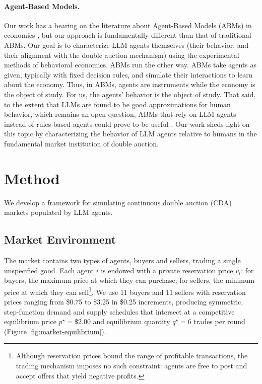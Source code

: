 \documentclass[letterpaper]{article} %
\begin{document}
\paragraph{Agent-Based Models.} Our work has a bearing on the literature about Agent-Based Models (ABMs) in economics \cite{tesfatsion2006handbook}, but our approach is fundamentally different than that of traditional ABMs. Our goal is to characterize LLM agents themselves (their behavior, and their alignment with the double auction mechanism) using the experimental methods of behavioral economics. ABMs run the other way. ABMs take agents as given, typically with fixed decision rules, and simulate their interactions to learn about the economy. Thus, in ABMs, agents are instruments while the economy is the object of study. For us, the agents' behavior is the object of study. That said, to the extent that LLMs are found to be good approximations for human behavior, which remains an open question, ABMs that rely on LLM agents instead of rules-based agents could prove to be useful \citep{gaoLargeLanguageModels2023, liEconAgentLargeLanguage2024a}. Our work sheds light on this topic by characterizing the behavior of LLM agents relative to humans in the fundamental market institution of double auction.

  \section{Method}

  We develop a framework for simulating continuous double auction (CDA) markets
  populated by LLM agents.

\subsection{Market Environment}
The market contains two types of agents, buyers and sellers, trading a single unspecified
good. Each agent $i$ is endowed with a private reservation price $v_{i}$: for buyers,
the maximum price at which they can purchase; for sellers, the minimum price
at which they can sell\footnote{Although reservation prices bound the range of profitable transactions, the trading mechanism imposes no such constraint: agents are
free to post and accept offers that yield negative profits.}. We use 11 buyers
and 11 sellers with reservation prices ranging from \$0.75 to \$3.25 in \$0.25
increments, producing symmetric, step-function demand and supply schedules
that intersect at a competitive equilibrium price $p^\star = \$2.00$ and equilibrium
quantity $q^\star = 6$ trades per round (Figure \ref{fig:market-equilibrium}). 
\end{document}

